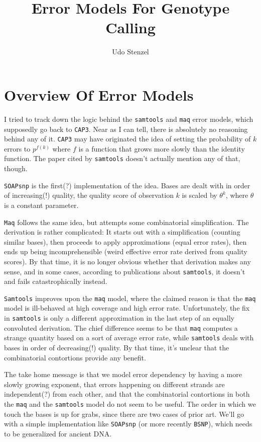 \documentclass{article}
\title{Error Models For Genotype Calling}
\author{Udo Stenzel}
\begin{document}
\maketitle

\section{Overview Of Error Models}

I tried to track down the logic behind the \texttt{samtools} and
\texttt{maq} error models, which supposedly go back to \texttt{CAP3}.
Near as I can tell, there is absolutely no reasoning behind any of it.
\texttt{CAP3} may have originated the idea of setting the probability of
$k$ errors to $p^{f(k)}$ where $f$ is a function that grows more slowly
than the identity function.  The paper cited by \texttt{samtools}
doesn't actually mention any of that, though.

\texttt{SOAPsnp}\cite{soapsnp} is the first(?) implementation of the idea.  Bases are
dealt with in order of increasing(!) quality, the quality score of
observation $k$ is scaled by $\theta^k$, where $\theta$ is a constant
parameter.

\texttt{Maq}\cite{maq} follows the same idea, but attempts some combinatorial
simplification.  The derivation is rather complicated:  It starts out
with a simplification (counting similar bases), then proceeds to apply
approximations (equal error rates), then ends up being incomprehensible
(weird effective error rate derived from quality scores).  By that time,
it is no longer obvious whether that derivation makes any sense, and in
some cases, according to publications about
\texttt{samtools}\cite{samtools}, it
doesn't and fails catastrophically instead.

\texttt{Samtools}\cite{samtools} improves upon the \texttt{maq} model, where the
claimed reason is that the \texttt{maq} model is ill-behaved at high
coverage and high error rate.  Unfortunately, the fix in
\texttt{samtools} is only a different approximation in the last step of
an equally convoluted derivation.  The chief difference seems to be that
\texttt{maq} computes a strange quantity based on a sort of average
error rate, while \texttt{samtools} deals with bases in order of
decreasing(!) quality.  By that time, it's unclear that the
combinatorial contortions provide any benefit.

The take home message is that we model error dependency by having a more
slowly growing exponent, that errors happening on different strands are
independent(?) from each other, and that the combinatorial
contortions in both the \texttt{maq} and the \texttt{samtools} model do
not seem to be useful.  The order in which we touch the bases is up for
grabs, since there are two cases of prior art.  We'll go with a simple
implementation like \texttt{SOAPsnp} (or more recently
\texttt{BSNP}\cite{bsnp}), which needs to be generalized for ancient
DNA.
\end{document}
